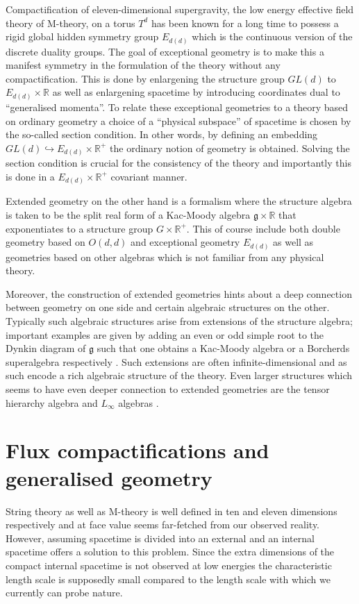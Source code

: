 Compactification of eleven-dimensional supergravity, the low energy effective field theory of M-theory, on a torus $T^d$ has been known for a long time to possess a rigid global hidden symmetry group $E_{d(d)}$\cite{CREMMER197848,Cremmer:1979up,Cremmer:1997ct} which is the continuous version of the discrete duality groups. The goal of exceptional geometry is to make this a manifest symmetry in the formulation of the theory without any compactification. This is done by enlargening the structure group $GL(d)$ to $E_{d(d)}\times\mathbb{R}$ as well as enlargening spacetime by introducing coordinates dual to ``generalised momenta''. To relate these exceptional geometries to a theory based on ordinary geometry a choice of a ``physical subspace'' of spacetime is chosen by the so-called section condition. In other words, by defining an embedding $GL(d)\hookrightarrow E_{d(d)}\times\mathbb{R}^+$ the ordinary notion of geometry is obtained. Solving the section condition is crucial for the consistency of the theory and importantly this is done in a $E_{d(d)}\times\mathbb{R}^+$ covariant manner. 

Extended geometry \cite{CederwallPalmkvist2017} on the other hand is a formalism where the structure algebra is taken to be the split real form of a Kac-Moody algebra $\mathfrak{g}\times\mathbb{R}$ that exponentiates to a structure group $G\times \mathbb{R}^+$. This of course include both double geometry based on $O(d,d)$ and exceptional geometry $E_{d(d)}$ as well as geometries based on other algebras which is not familiar from any physical theory. 

Moreover, the construction of extended geometries hints about a deep connection between geometry on one side and certain algebraic structures on the other. Typically such algebraic structures arise from extensions of the structure algebra; important examples are given by adding an even or odd simple root to the Dynkin diagram of $\mathfrak{g}$ such that one obtains a Kac-Moody algebra or a Borcherds superalgebra respectively \cite{Palmkvist2015ExpGeomSuperAlg,CederwallPalmkvistSuperalgebras2015}. Such extensions are often infinite-dimensional and as such encode a rich algebraic structure of the theory. Even larger structures which seems to have even deeper connection to extended geometries are the tensor hierarchy algebra \cite{Palmkvist:2013vya,Carbone:2018njd} and $L_\infty$ algebras \cite{Cederwall:2018aab,Hohm:2017pnh}.


\section{Flux compactifications and generalised geometry}
String theory as well as M-theory is well defined in ten and eleven dimensions respectively and at face value seems far-fetched from our observed reality. However, assuming spacetime is divided into an external and an internal spacetime offers a solution to this problem. Since the extra dimensions of the compact internal spacetime is not observed at low energies the characteristic length scale is supposedly small compared to the length scale with which we currently can probe nature.

